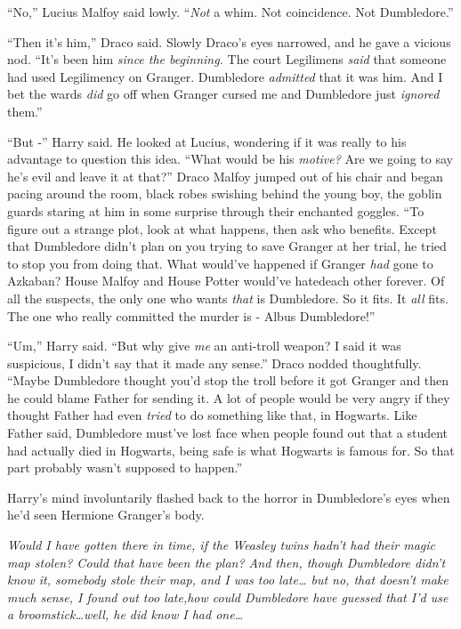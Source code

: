 ``No,'' Lucius Malfoy said lowly. ``\emph{Not} a whim. Not coincidence. Not Dumbledore.''

``Then it's him,'' Draco said. Slowly Draco's eyes narrowed, and he gave a vicious nod. ``It's been him \emph{since the beginning.} The court Legilimens \emph{said} that someone had used Legilimency on Granger. Dumbledore \emph{admitted} that it was him. And I bet the wards \emph{did} go off when Granger cursed me and Dumbledore just \emph{ignored} them.''

``But -'' Harry said. He looked at Lucius, wondering if it was really to his advantage to question this idea. ``What would be his \emph{motive?} Are we going to say he's evil and leave it at that?'' Draco Malfoy jumped out of his chair and began pacing around the room, black robes swishing behind the young boy, the goblin guards staring at him in some surprise through their enchanted goggles. ``To figure out a strange plot, look at what happens, then ask who benefits. Except that Dumbledore didn't plan on you trying to save Granger at her trial, he tried to stop you from doing that. What would've happened if Granger \emph{had} gone to Azkaban? House Malfoy and House Potter would've hatedeach other forever. Of all the suspects, the only one who wants \emph{that} is Dumbledore. So it fits. It \emph{all} fits. The one who really committed the murder is - Albus Dumbledore!''

``Um,'' Harry said. ``But why give \emph{me} an anti-troll weapon? I said it was suspicious, I didn't say that it made any sense.''
Draco nodded thoughtfully. ``Maybe Dumbledore thought you'd stop the troll before it got Granger and then he could blame Father for sending it. A lot of people would be very angry if they thought Father had even \emph{tried} to do something like that, in Hogwarts. Like Father said, Dumbledore must've lost face when people found out that a student had actually died in Hogwarts, being safe is what Hogwarts is famous for. So that part probably wasn't supposed to happen.''

Harry's mind involuntarily flashed back to the horror in Dumbledore's eyes when he'd seen Hermione Granger's body.

\emph{Would I have gotten there in time, if the Weasley twins hadn't had their magic map stolen? Could that have been the plan? And then, though Dumbledore didn't know it, somebody stole their map, and I was too late\ldots{} but no, that doesn't make much sense, I found out too late,how could Dumbledore have guessed that I'd use a broomstick\ldots{}well, he did know I had one\ldots{}}

